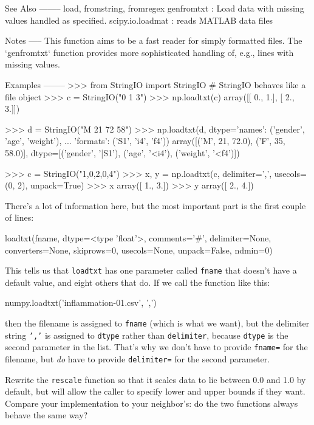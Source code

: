 \begin{VerbOut}
    See Also
    --------
    load, fromstring, fromregex
    genfromtxt : Load data with missing values handled as specified.
    scipy.io.loadmat : reads MATLAB data files

    Notes
    -----
    This function aims to be a fast reader for simply formatted files.  The
    `genfromtxt` function provides more sophisticated handling of, e.g.,
    lines with missing values.

    Examples
    --------
    >>> from StringIO import StringIO   # StringIO behaves like a file object
    >>> c = StringIO("0 1 3")
    >>> np.loadtxt(c)
    array([[ 0.,  1.],
           [ 2.,  3.]])

    >>> d = StringIO("M 21 72 58")
    >>> np.loadtxt(d, dtype={'names': ('gender', 'age', 'weight'),
    ...                      'formats': ('S1', 'i4', 'f4')})
    array([('M', 21, 72.0), ('F', 35, 58.0)],
          dtype=[('gender', '|S1'), ('age', '<i4'), ('weight', '<f4')])

    >>> c = StringIO("1,0,2,0,4")
    >>> x, y = np.loadtxt(c, delimiter=',', usecols=(0, 2), unpack=True)
    >>> x
    array([ 1.,  3.])
    >>> y
    array([ 2.,  4.])
\end{VerbOut}

There's a lot of information here, but the most important part is the
first couple of lines:

\begin{VerbOut}
loadtxt(fname, dtype=<type 'float'>, comments='#', delimiter=None, converters=None, skiprows=0, usecols=None,
        unpack=False, ndmin=0)
\end{VerbOut}

This tells us that \texttt{loadtxt} has one parameter called
\texttt{fname} that doesn't have a default value, and eight others that
do. If we call the function like this:

\begin{VerbIn}
numpy.loadtxt('inflammation-01.csv', ',')
\end{VerbIn}

then the filename is assigned to \texttt{fname} (which is what we want),
but the delimiter string \texttt{','} is assigned to \texttt{dtype}
rather than \texttt{delimiter}, because \texttt{dtype} is the second
parameter in the list. That's why we don't have to provide
\texttt{fname=} for the filename, but \emph{do} have to provide
\texttt{delimiter=} for the second parameter.

\begin{challenge}
  Rewrite the \texttt{rescale} function so that it scales data to lie
  between 0.0 and 1.0 by default, but will allow the caller to specify
  lower and upper bounds if they want. Compare your implementation to
  your neighbor's: do the two functions always behave the same way?
\end{challenge}

